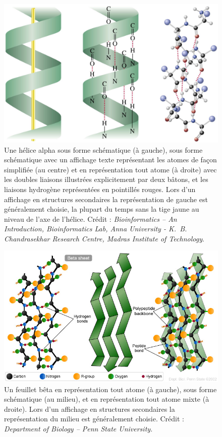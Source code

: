 	\begin{figure}[H]
		\centering
		\includegraphics[width=\textwidth]{figures/ch1/aHelix}
		\caption[Hélices alpha, trois représentations différentes.]{Une hélice alpha sous forme schématique (à gauche), sous forme schématique avec un affichage texte représentant les atomes de façon simplifiée (au centre) et en représentation \og tout atome \fg{} (à droite) avec les doubles liaisons illustrées explicitement par deux bâtons, et les liaisons hydrogène représentées en pointillés rouges. Lors d'un affichage \og en structures secondaires \fg{} la représentation de gauche est généralement choisie, la plupart du temps sans la tige jaune au niveau de l'axe de l'hélice. Crédit : \emph{\emph{Bioinformatics -- An Introduction}, Bioinformatics Lab, Anna University - K.~B. Chandrasekhar Research Centre, Madras Institute of Technology}\footnotemark.}
		\label{fig:aHelix}
	\end{figure}
	
		
	\begin{figure}[H]
		\centering
		\includegraphics[width=\textwidth]{figures/ch1/bSheet}
		\caption{Un feuillet bêta en représentation \og tout atome \fg{} (à gauche), sous forme schématique (au milieu), et en représentation \og tout atome \fg{} mixte (à droite). Lors d'un affichage \og en structures secondaires \fg{} la représentation du milieu est généralement choisie. Crédit : \emph{Department of Biology -- Penn State University.}}
		\label{fig:bSheet}
	\end{figure}
		
